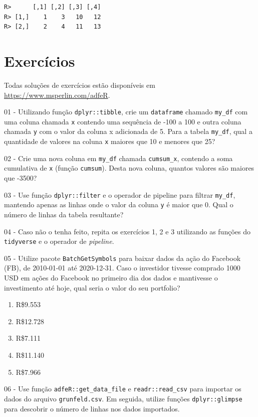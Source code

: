 \documentclass[
  11pt,
]{book}
\providecommand{\tightlist}{%
  \setlength{\itemsep}{0pt}\setlength{\parskip}{0pt}}
\begin{document}
\begin{verbatim}
R>      [,1] [,2] [,3] [,4]
R> [1,]    1    3   10   12
R> [2,]    2    4   11   13
\end{verbatim}

\hypertarget{exerc-classe-estrutura}{%
\section{Exercícios}\label{exerc-classe-estrutura}}

Todas soluções de exercícios estão disponíveis em \url{https://www.msperlin.com/adfeR}.

01 -
Utilizando função \texttt{dplyr::tibble}, crie um \texttt{dataframe} chamado \texttt{my\_df} com uma coluna chamada \texttt{x} contendo uma sequência de -100 a 100 e outra coluna chamada \texttt{y} com o valor da coluna x adicionada de 5. Para a tabela \texttt{my\_df}, qual a quantidade de valores na coluna \texttt{x} maiores que 10 e menores que 25?

02 -
Crie uma nova coluna em \texttt{my\_df} chamada \texttt{cumsum\_x}, contendo a soma cumulativa de \texttt{x} (função \texttt{cumsum}). Desta nova coluna, quantos valores são maiores que -3500?

03 -
Use função \texttt{dplyr::filter} e o operador de pipeline para filtrar \texttt{my\_df}, mantendo apenas as linhas onde o valor da coluna \texttt{y} é maior que 0. Qual o número de linhas da tabela resultante?

04 -
Caso não o tenha feito, repita os exercícios 1, 2 e 3 utilizando as funções do \texttt{tidyverse} e o operador de \emph{pipeline}.

05 -
Utilize pacote \texttt{BatchGetSymbols} para baixar dados da ação do Facebook (FB), de 2010-01-01 até 2020-12-31. Caso o investidor tivesse comprado 1000 USD em ações do Facebook no primeiro dia dos dados e mantivesse o investimento até hoje, qual seria o valor do seu portfolio?

\begin{enumerate}
\def\labelenumi{\alph{enumi})}
\tightlist
\item
  R\$9.553
\item
  R\$12.728
\item
  R\$7.111
\item
  R\$11.140
\item
  R\$7.966
\end{enumerate}

06 -
Use função \texttt{adfeR::get\_data\_file} e \texttt{readr::read\_csv} para importar os dados do arquivo \texttt{grunfeld.csv}. Em seguida, utilize funções \texttt{dplyr::glimpse} para descobrir o número de linhas nos dados importados.
\end{document}
